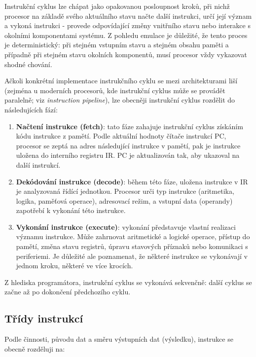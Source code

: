 Instrukční cyklus lze chápat jako opakovanou posloupnost kroků, při nichž procesor na základě svého
aktuálního stavu načte další instrukci, určí její význam a vykoná instrukci - provede odpovídající
změny vnitřního stavu nebo interakce s okolními komponentami systému.
Z pohledu emulace je důležité, že tento proces je deterministický: při stejném vstupním stavu a
stejném obsahu paměti a případně při stejném stavu okolních komponentů, musí procesor vždy
vykazovat shodné chování.

Ačkoli konkrétní implementace instrukčního cyklu se mezi architekturami liší (zejména u moderních
procesorů, kde instrukční cyklus může se provádět paralelně; viz \emph{instruction pipeline}), lze
obecněji instrukční cyklus rozdělit do následujících fází:

\begin{enumerate}
    \item \textbf{Načtení instrukce (fetch)}: tato fáze zahajuje instrukční cyklus získáním kódu
        instrukce z pamětí. Podle aktuální hodnoty čítače instrukcí PC, procesor se zeptá na adres
        následující instrukce v pamětí, pak je instrukce uložena do interního registru IR. PC je
        aktualizován tak, aby ukazoval na další instrukcí.
    \item \textbf{Dekódování instrukce (decode)}: během této fáze, uložena instrukce v IR je
        analyzovaná řídící jednotkou. Procesor urči typ instrukce (aritmetika, logika, paměťová
        operace), adresovací režim, a vstupní data (operandy) zapotřebí k vykonání této instrukce.
    \item \textbf{Vykonání instrukce (execute)}: vykonání představuje vlastní realizaci významu
        instrukce. Může zahrnovat aritmetické a logické operace, přístup do pamětí, změna stavu
        registrů, úpravu stavových příznaků nebo komunikaci s periferiemi. Je důležité ale
        poznamenat, že některé instrukce se vykonávají v jednom kroku, některé ve více krocích.
\end{enumerate}

Z hlediska programátora, instrukční cyklus se vykonává sekvenčně: další cyklus se začne až po
dokončení předchozího cyklu.

\subsection{Třídy instrukcí}

Podle činnosti, původu dat a směru výstupních dat (výsledku), instrukce se obecně rozděluji na:

